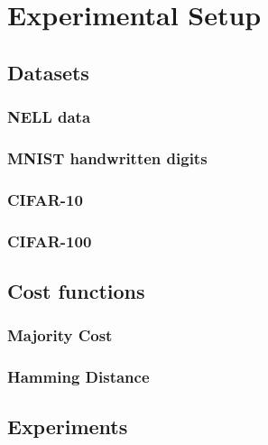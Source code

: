 \chapter{Experimental Setup}

\section{Datasets}

\subsection{NELL data}

\subsection{MNIST handwritten digits}

\subsection{CIFAR-10}

\subsection{CIFAR-100}

\section{Cost functions}

\subsection{Majority Cost}

\subsection{Hamming Distance}

\section{Experiments}